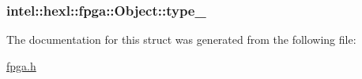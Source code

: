 \hypertarget{structintel_1_1hexl_1_1fpga_1_1Object_a795a35540ad7bb347d3978ca83f72e8b}{
\subsubsection[{type\-\_\-}]{ intel\-::hexl\-::fpga\-::\-Object\-::type\-\_\-}}\label{structintel_1_1hexl_1_1fpga_1_1Object_a795a35540ad7bb347d3978ca83f72e8b}


The documentation for this struct was generated from the following file\-:\begin{DoxyCompactItemize}
\item 
\hyperlink{fpga_8h}{fpga.\-h}\end{DoxyCompactItemize}
